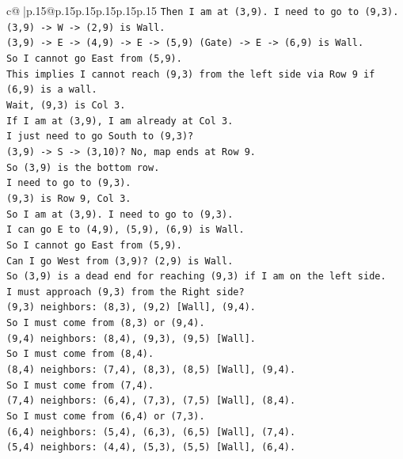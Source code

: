 \documentclass{article}
\begin{document}
{\begin{supertabular}{c@{$\;$}|p{.15\linewidth}@{}p{.15\linewidth}p{.15\linewidth}p{.15\linewidth}p{.15\linewidth}p{.15\linewidth}}
{{{\texttt{Then I am at (3,9). I need to go to (9,3).} \\
\texttt{(3,9) {-}> W {-}> (2,9) is Wall.} \\
\texttt{(3,9) {-}> E {-}> (4,9) {-}> E {-}> (5,9) (Gate) {-}> E {-}> (6,9) is Wall.} \\
\texttt{So I cannot go East from (5,9).} \\
\texttt{This implies I cannot reach (9,3) from the left side via Row 9 if (6,9) is a wall.} \\
\texttt{Wait, (9,3) is Col 3.} \\
\texttt{If I am at (3,9), I am already at Col 3.} \\
\texttt{I just need to go South to (9,3)?} \\
\texttt{(3,9) {-}> S {-}> (3,10)? No, map ends at Row 9.} \\
\texttt{So (3,9) is the bottom row.} \\
\texttt{I need to go to (9,3).} \\
\texttt{(9,3) is Row 9, Col 3.} \\
\texttt{So I am at (3,9). I need to go to (9,3).} \\
\texttt{I can go E to (4,9), (5,9), (6,9) is Wall.} \\
\texttt{So I cannot go East from (5,9).} \\
\texttt{Can I go West from (3,9)? (2,9) is Wall.} \\
\texttt{So (3,9) is a dead end for reaching (9,3) if I am on the left side.} \\
\texttt{I must approach (9,3) from the Right side?} \\
\texttt{(9,3) neighbors: (8,3), (9,2) {[}Wall{]}, (9,4).} \\
\texttt{So I must come from (8,3) or (9,4).} \\
\texttt{(9,4) neighbors: (8,4), (9,3), (9,5) {[}Wall{]}.} \\
\texttt{So I must come from (8,4).} \\
\texttt{(8,4) neighbors: (7,4), (8,3), (8,5) {[}Wall{]}, (9,4).} \\
\texttt{So I must come from (7,4).} \\
\texttt{(7,4) neighbors: (6,4), (7,3), (7,5) {[}Wall{]}, (8,4).} \\
\texttt{So I must come from (6,4) or (7,3).} \\
\texttt{(6,4) neighbors: (5,4), (6,3), (6,5) {[}Wall{]}, (7,4).} \\
\texttt{(5,4) neighbors: (4,4), (5,3), (5,5) {[}Wall{]}, (6,4).} \\
}}}
\end{supertabular}}
\end{document}

